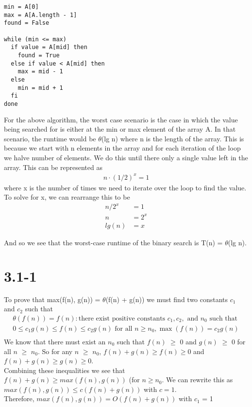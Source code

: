 \documentclass{article}
\begin{document}
{\begin{verbatim}
min = A[0]
max = A[A.length - 1]
found = False

while (min <= max)
  if value = A[mid] then
    found = True
  else if value < A[mid] then
    max = mid - 1
  else
    min = mid + 1
  fi
done
\end{verbatim}

\noindent
For the above algorithm, the worst case scenario is the case in which the value
being searched for is either at the min or max element of the array A. In
that scenario, the runtime would be $\theta$(lg n) where n is the length of the
array. This is because we start with n elements in the array and for each
iteration of the loop we halve number of elements. We do this until there
only a single value left in the array. This can be represented as
\begin{align*}
  n \cdot (1/2)^x = 1
\end{align*}
where x is the number of times we need to iterate over the loop to find
the value. To solve for x, we can rearrange this to be
\begin{align*}
  n/2^x &= 1 \\
  n &= 2^x \\
  lg(n) &= x
\end{align*}

And so we see that the worst-case runtime of the binary search is
T(n) = $\theta$(lg n).
\section{3.1-1}
To prove that max(f(n), g(n)) = $\theta$(f(n) + g(n)) we must find two constants $c_{1}$ and $c_{2}$ such that \\
\begin{align*}
  \theta(f(n)) = f(n) : \textrm{there exist positive constants } c_1, c_2, \text{ and } n_0
  \text{ such that } \\
  0 \leq c_1g(n) \leq f(n) \leq c_2g(n) \textrm{ for all } n \geq n_0, \max(f(n)) = c_2g(n) \\
\end{align*}
We know that there must exist an $n_{0}$ such that $f(n)$ $\geq$ 0 and $g(n)$ $\geq$ 0 for all
$n$ $\geq$ $n_{0}$. So for any $n$ $\geq$ $n_{0}$, $f(n) + g(n) \geq f(n) \geq 0$ and $f(n) +
g(n) \geq g(n) \geq 0$. \\
Combining these inequalities we see that $f(n) + g(n) \geq max(f(n),g(n))$ (for $n \geq n_{0}$.
We can rewrite this as $max(f(n),g(n)) \leq c(f(n) + g(n))$ with $c = 1$. \\
Therefore, $max(f(n),g(n)) = O(f(n) + g(n))$ with $c_{1}$ = 1\\

}
\end{document}
